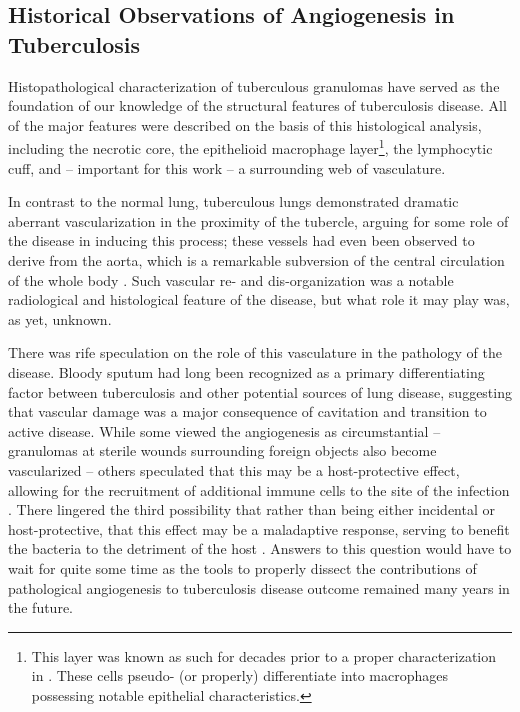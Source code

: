 \subsection{Historical Observations of Angiogenesis in Tuberculosis}\label{histtbang}

Histopathological characterization of tuberculous granulomas have served as the foundation of our knowledge of the structural features of tuberculosis disease. All of the major features were described on the basis of this histological analysis, including the necrotic core, the epithelioid macrophage layer\footnote{This layer was known as such for decades prior to a proper characterization in \citet{Cronan2016}. These cells pseudo\hyp{} (or properly) differentiate into macrophages possessing notable epithelial characteristics.}, the lymphocytic cuff, and -- important for this work -- a surrounding web of vasculature. 

In contrast to the normal lung, tuberculous lungs demonstrated dramatic aberrant vascularization in the proximity of the tubercle, arguing for some role of the disease in inducing this process; these vessels had even been observed to derive from the aorta, which is a remarkable subversion of the central circulation of the whole body \citep{Cudkowicz1952}. Such vascular re\hyp{} and dis\hyp{}organization was a notable radiological and histological feature of the disease, but what role it may play was, as yet, unknown.

There was rife speculation on the role of this vasculature in the pathology of the disease. Bloody sputum had long been recognized as a primary differentiating factor between tuberculosis and other potential sources of lung disease, suggesting that vascular damage was a major consequence of cavitation and transition to active disease. While some viewed the angiogenesis as circumstantial -- granulomas at sterile wounds surrounding foreign objects also become vascularized -- others speculated that this may be a host\hyp{}protective effect, allowing for the recruitment of additional immune cells to the site of the infection \citep{Miller1938, Cudkowicz1952, Gale1957, Oehlers2015}. There lingered the third possibility that rather than being either incidental or host\hyp{}protective, that this effect may be a maladaptive response, serving to benefit the bacteria to the detriment of the host \citep{Cudkowicz1952}. Answers to this question would have to wait for quite some time as the tools to properly dissect the contributions of pathological angiogenesis to tuberculosis disease outcome remained many years in the future.

